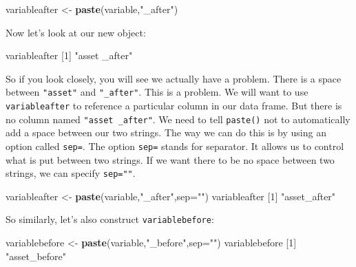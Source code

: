 \documentclass[
]{book}
\newenvironment{Shaded}{\begin{snugshade}}{\end{snugshade}}
\newcommand{\AttributeTok}[1]{\textcolor[rgb]{0.13,0.29,0.53}{#1}}
\newcommand{\DecValTok}[1]{\textcolor[rgb]{0.00,0.00,0.81}{#1}}
\newcommand{\FunctionTok}[1]{\textcolor[rgb]{0.13,0.29,0.53}{\textbf{#1}}}
\newcommand{\NormalTok}[1]{#1}
\newcommand{\OtherTok}[1]{\textcolor[rgb]{0.56,0.35,0.01}{#1}}
\newcommand{\StringTok}[1]{\textcolor[rgb]{0.31,0.60,0.02}{#1}}
\begin{document}
\begin{Shaded}
\begin{Highlighting}[]
\NormalTok{variableafter }\OtherTok{\textless{}{-}} \FunctionTok{paste}\NormalTok{(variable,}\StringTok{"\_after"}\NormalTok{)}
\end{Highlighting}
\end{Shaded}

Now let's look at our new object:

\begin{Shaded}
\begin{Highlighting}[]
\NormalTok{variableafter}
\NormalTok{[}\DecValTok{1}\NormalTok{] }\StringTok{"asset \_after"}
\end{Highlighting}
\end{Shaded}

So if you look closely, you will see we actually have a problem. There is a space between \texttt{"asset"} and \texttt{"\_after"}. This is a problem. We will want to use \texttt{variableafter} to reference a particular column in our data frame. But there is no column named \texttt{"asset\ \_after"}. We need to tell \texttt{paste()} not to automatically add a space between our two strings. The way we can do this is by using an option called \texttt{sep=}. The option \texttt{sep=} stands for separator. It allows us to control what is put between two strings. If we want there to be no space between two strings, we can specify \texttt{sep=""}.

\begin{Shaded}
\begin{Highlighting}[]
\NormalTok{variableafter }\OtherTok{\textless{}{-}} \FunctionTok{paste}\NormalTok{(variable,}\StringTok{"\_after"}\NormalTok{,}\AttributeTok{sep=}\StringTok{""}\NormalTok{)}
\NormalTok{variableafter}
\NormalTok{[}\DecValTok{1}\NormalTok{] }\StringTok{"asset\_after"}
\end{Highlighting}
\end{Shaded}

So similarly, let's also construct \texttt{variablebefore}:

\begin{Shaded}
\begin{Highlighting}[]
\NormalTok{variablebefore }\OtherTok{\textless{}{-}} \FunctionTok{paste}\NormalTok{(variable,}\StringTok{"\_before"}\NormalTok{,}\AttributeTok{sep=}\StringTok{""}\NormalTok{)}
\NormalTok{variablebefore}
\NormalTok{[}\DecValTok{1}\NormalTok{] }\StringTok{"asset\_before"}
\end{Highlighting}
\end{Shaded}
\end{document}
